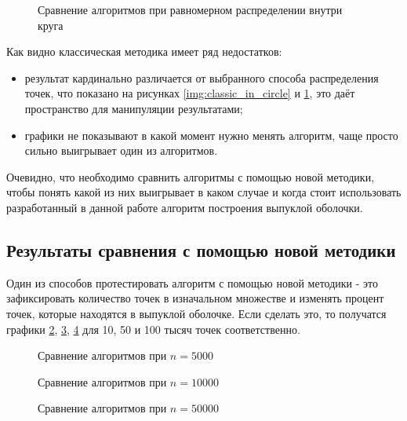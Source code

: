 \begin{figure}[hbt]
	\centering
	
	\caption{Сравнение алгоритмов при равномерном распределении внутри круга}
	\label{img:classic_on_circle}
\end{figure}

Как видно классическая методика имеет ряд недостатков:
\begin{itemize}
	\item результат кардинально различается от выбранного способа распределения точек, что показано на рисунках \ref{img:classic_in_circle} и \ref{img:classic_on_circle}, это даёт пространство для манипуляции результатами;	
	\item графики не показывают в какой момент нужно менять алгоритм, чаще просто сильно выигрывает один из алгоритмов.
\end{itemize}

Очевидно, что необходимо сравнить алгоритмы с помощью новой методики, чтобы понять какой из них выигрывает в каком случае и когда стоит использовать разработанный в данной работе алгоритм построения выпуклой оболочки.

\subsection{Результаты сравнения с помощью новой методики}

Один из способов протестировать алгоритм с помощью новой методики - это зафиксировать количество точек в изначальном множестве и изменять процент точек, которые находятся в выпуклой оболочке. Если сделать это, то получатся графики \ref{img:comparison_5000}, \ref{img:comparison_10000}, \ref{img:comparison_50000} для 10, 50 и 100 тысяч точек соответственно.

\begin{figure}[H]
	\centering
	
	\caption{Сравнение алгоритмов при $n = 5000$}
	\label{img:comparison_5000}
\end{figure}

\begin{figure}[H]
	\centering
	
	\caption{Сравнение алгоритмов при $n = 10000$}
	\label{img:comparison_10000}
\end{figure}

\begin{figure}[H]
	\centering
	
	\caption{Сравнение алгоритмов при $n = 50000$}
	\label{img:comparison_50000}
\end{figure}


